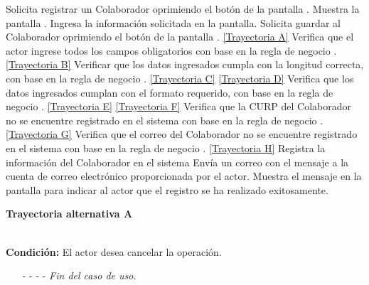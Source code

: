 	\begin{UCtrayectoria}
		\UCpaso[\UCactor] Solicita registrar un Colaborador oprimiendo el botón  de la pantalla .
		\UCpaso[\UCsist] Muestra la pantalla .
		\UCpaso[\UCactor] Ingresa la información solicitada en la pantalla. \label{CU3.1-P3}
		\UCpaso[\UCactor] Solicita guardar al Colaborador oprimiendo el botón  de la pantalla . \hyperlink{CU3-1:TAA}{[Trayectoria A]}
		\UCpaso[\UCsist] Verifica que el actor ingrese todos los campos obligatorios con base en la regla de negocio . \hyperlink{CU3-1:TAB}{[Trayectoria B]}
		\UCpaso[\UCsist] Verificar que los datos ingresados cumpla con la longitud correcta, con base en la regla de negocio . \hyperlink{CU3-1:TAC}{[Trayectoria C]} \hyperlink{CU3-1:TAD}{[Trayectoria D]}
		\UCpaso[\UCsist] Verifica que los datos ingresados cumplan con el formato requerido, con base en la regla de negocio . \hyperlink{CU3-1:TAE}{[Trayectoria E]} \hyperlink{CU3-1:TAF}{[Trayectoria F]}
		\UCpaso[\UCsist] Verifica que la CURP del Colaborador no se encuentre registrado en el sistema con base en la regla de negocio . \hyperlink{CU3-1:TAG}{[Trayectoria G]}
		\UCpaso[\UCsist] Verifica que el correo del Colaborador no se encuentre registrado en el sistema con base en la regla de negocio . \hyperlink{CU3-1:TAH}{[Trayectoria H]}
		\UCpaso[\UCsist] Registra la información del Colaborador en el sistema
		\UCpaso[\UCsist] Envía un correo con el mensaje  a la cuenta de correo electrónico proporcionada por el actor.
		\UCpaso[\UCsist] Muestra el mensaje  en la pantalla  para indicar al actor que el registro se ha realizado exitosamente.
	\end{UCtrayectoria}		
\hypertarget{CU3-1:TAA}{\textbf{Trayectoria alternativa A}}\\
\noindent \textbf{Condición:} El actor desea cancelar la operación.
\begin{enumerate}
	\UCpaso[\UCactor] Solicita cancelar la operación oprimiendo el botón  de la pantalla .
	\UCpaso[\UCsist] Muestra la pantalla 
	\item[- -] - - {\em {Fin del caso de uso}}.%
\end{enumerate}
